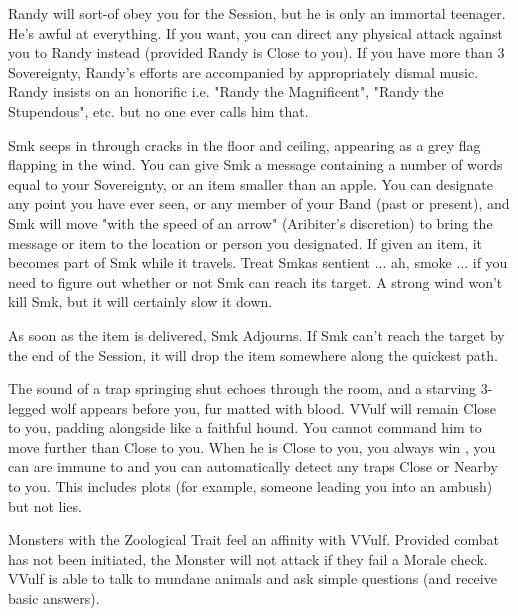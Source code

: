 Randy will sort-of obey you for the Session, but he is only an immortal teenager. He's awful at everything. If you want, you can direct any physical attack against you to Randy instead (provided Randy is Close to you).  If you have more than 3 Sovereignty, Randy's efforts are accompanied by appropriately dismal music.  Randy insists on an honorific i.e. "Randy the Magnificent", "Randy the Stupendous", etc. but no one ever calls him that.


Sm{\UmlautO}k seeps in through cracks in the floor and ceiling, appearing as a grey flag flapping in the wind. You can give Sm{\UmlautO}k a message containing a number of words equal to your Sovereignty, or an item smaller than an apple. You can designate any point you have ever seen, or any member of your Band (past or present), and Sm{\UmlautO}k will move "with the speed of an arrow" (Aribiter's discretion) to bring the message or item to the location or person you designated. If given an item, it becomes part of Sm{\UmlautO}k while it travels. Treat Sm{\UmlautO}kas sentient ... ah, smoke ... if you need to figure out whether or not Sm{\UmlautO}k can reach its target. A strong wind won't kill Sm{\UmlautO}k, but it will certainly slow it down.

As soon as the item is delivered, Sm{\UmlautO}k Adjourns. If Sm{\UmlautO}k can't reach the target by the end of the Session, it will drop the item somewhere along the quickest path.



The sound of a trap springing shut echoes through the room, and a starving 3-legged wolf appears before you, fur matted with blood. VVulf will remain Close to you, padding alongside like a faithful hound. You cannot command him to move further than Close to you. When he is Close to you, you always win , you can are immune to  and you can automatically detect any traps Close or Nearby to you. This includes plots (for example, someone leading you into an ambush) but not lies.

Monsters with the Zoological Trait feel an affinity with VVulf. Provided combat has not been initiated, the Monster will not attack if they fail a Morale check.  VVulf is able to talk to mundane animals and ask simple questions (and receive basic answers).  

